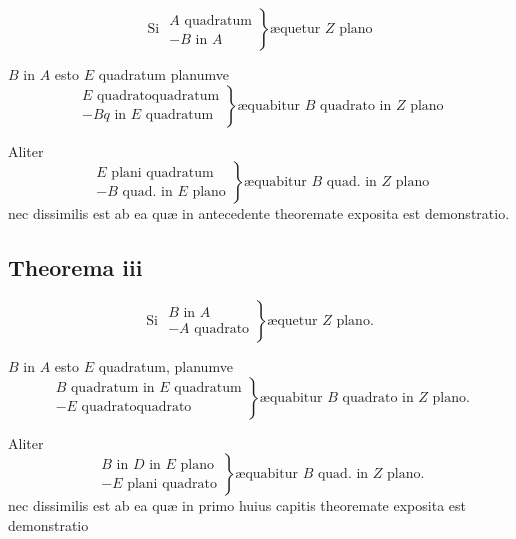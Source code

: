 \documentclass[11pt,a4paper]{article}
\begin{document}
\[ \text{Si } \left.\begin{array}{l} A \text{ quadratum} \\ - B \text{ in } A \end{array}\right\} \text{æquetur } Z \text{ plano} \]

$B$ in $A$ esto $E$ quadratum planumve
\[ \left.\begin{array}{l} E \text{ quadratoquadratum} \\ - B q \text{ in } E \text{ quadratum} \end{array}\right\} \text{æquabitur } B \text{ quadrato in } Z \text{ plano} \]

Aliter
\[ \left.\begin{array}{l} E \text{ plani quadratum} \\ - B \text{ quad. in } E \text{ plano} \end{array}\right\} \text{æquabitur } B \text{ quad. in } Z \text{ plano} \]
nec dissimilis est ab ea quæ in antecedente theoremate exposita est demonstratio.

\subsection*{Theorema iii}

\[ \text{Si } \left.\begin{array}{l} B \text{ in } A \\ - A \text{ quadrato} \end{array}\right\} \text{æquetur } Z \text{ plano.} \]

$B$ in $A$ esto $E$ quadratum, planumve
\[ \left.\begin{array}{l} B \text{ quadratum in } E \text{ quadratum} \\ - E \text{ quadratoquadrato} \end{array}\right\} \text{æquabitur } B \text{ quadrato in } Z \text{ plano.} \]

Aliter
\[ \left.\begin{array}{l} B \text{ in } D \text{ in } E \text{ plano} \\ - E \text{ plani quadrato} \end{array}\right\} \text{æquabitur } B \text{ quad. in } Z \text{ plano.} \]
nec dissimilis est ab ea quæ in primo huius capitis theoremate exposita est demonstratio
\end{document}
